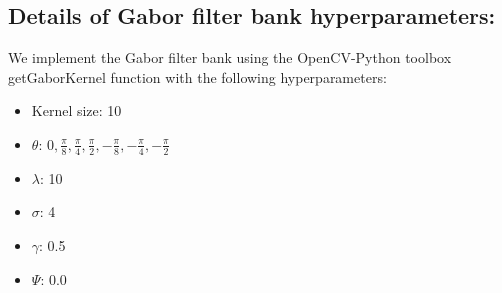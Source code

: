 \documentclass[runningheads]{llncs}
\begin{document}
\subsection*{Details of Gabor filter bank hyperparameters:} We implement the Gabor filter bank using the OpenCV-Python toolbox getGaborKernel function with the following hyperparameters: 
\begin{itemize}
    \item Kernel size: 10
    \item $\theta$: $0, \frac{\pi}{8}, \frac{\pi}{4}, \frac{\pi}{2}, -\frac{\pi}{8}, -\frac{\pi}{4}, -\frac{\pi}{2}$
    \item $\lambda$: 10
    \item $\sigma$: 4
    \item $\gamma$: 0.5
    \item $\Psi$: 0.0 
\end{itemize}
\end{document}
